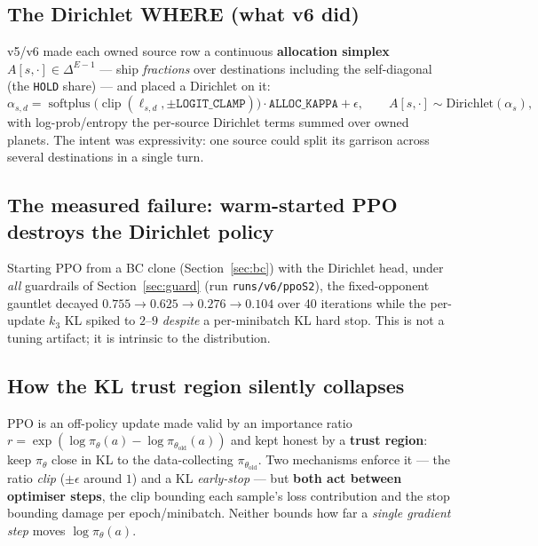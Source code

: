 \documentclass[11pt]{article}
\newcommand{\pol}{\pi_\theta}
\newcommand{\polold}{\pi_{\theta_{\mathrm{old}}}}
\newcommand{\softplus}{\operatorname{softplus}}
\newcommand{\clip}{\operatorname{clip}}
\newcommand{\cd}[1]{\texttt{#1}}
\begin{document}
\subsection{The Dirichlet WHERE (what v6 did)}
v5/v6 made each owned source row a continuous \textbf{allocation simplex} $A[s,\cdot]\in\Delta^{E-1}$ ---
ship \emph{fractions} over destinations including the self-diagonal (the \cd{HOLD} share) --- and placed a
Dirichlet on it:
\begin{equation}
\alpha_{s,d}=\softplus\!\big(\clip(\ell_{s,d},\pm\cd{LOGIT\_CLAMP})\big)\cdot\cd{ALLOC\_KAPPA}+\epsilon,
\qquad A[s,\cdot]\sim\mathrm{Dirichlet}(\alpha_s),
\label{eq:dir}
\end{equation}
with log-prob/entropy the per-source Dirichlet terms summed over owned planets. The intent was
expressivity: one source could split its garrison across several destinations in a single turn.

\subsection{The measured failure: warm-started PPO destroys the Dirichlet policy}
Starting PPO from a BC clone (Section~\ref{sec:bc}) with the Dirichlet head, under \emph{all} guardrails
of Section~\ref{sec:guard} (run \cd{runs/v6/ppoS2}), the fixed-opponent gauntlet decayed
$0.755\to0.625\to0.276\to0.104$ over 40 iterations while the per-update $k_3$ KL spiked to $2$--$9$
\emph{despite} a per-minibatch KL hard stop. This is not a tuning artifact; it is intrinsic to the
distribution.

\subsection{How the KL trust region silently collapses}
PPO is an off-policy update made valid by an importance ratio
$r=\exp(\log\pol(a)-\log\polold(a))$ and kept honest by a \textbf{trust region}: keep $\pol$ close in KL
to the data-collecting $\polold$. Two mechanisms enforce it --- the ratio \emph{clip}
($\pm\epsilon$ around $1$) and a KL \emph{early-stop} --- but \textbf{both act between optimiser steps},
the clip bounding each sample's loss contribution and the stop bounding damage per epoch/minibatch.
Neither bounds how far a \emph{single gradient step} moves $\log\pol(a)$.
\end{document}
